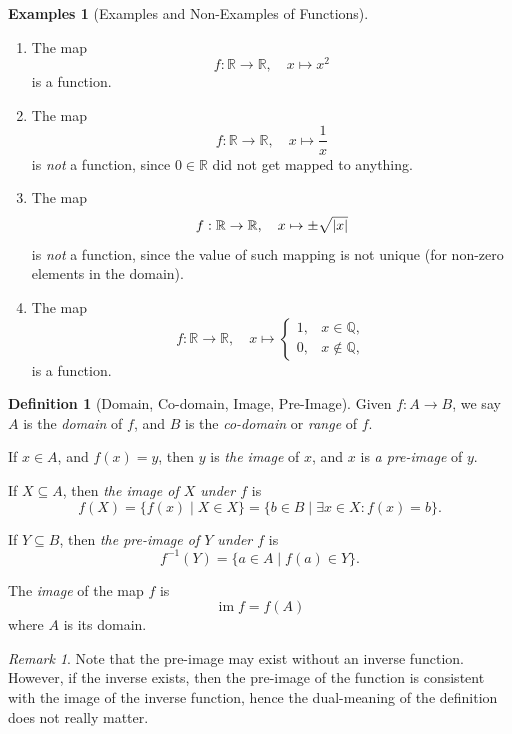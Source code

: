 \documentclass{article}
\theoremstyle{definition}
\newtheorem{definition}[theorem]{Definition}
\newtheorem{examples}[theorem]{Examples}
\theoremstyle{remark}
\newtheorem{remark}[theorem]{Remark}
\DeclarePairedDelimiter{\abs}{\lvert}{\rvert}
\newcommand{\pqty}[1]{\left(#1\right)}
\newcommand{\set}[2]{\{#1\mid #2\}}
\newcommand{\functiondomain}[3]{#1:#2\to #3}
\newcommand{\function}[5]{#1:#2\to #3,\quad #4\mapsto #5}
\newcommand{\inverse}{^{-1}}
\newcommand{\img}{\operatorname{im}}
\newcommand{\QQ}{\mathbb{Q}}
\newcommand{\RR}{\mathbb{R}}
\begin{document}
\begin{examples}[Examples and Non-Examples of Functions]
    \begin{enumerate}
        \item The map
        \[
            \function{f}{\RR}{\RR}{x}{x^2}
        \]
        is a function.

        \item The map
        \[
            \function{f}{\RR}{\RR}{x}{\frac{1}{x}}
        \]
        is \emph{not} a function, since \(0 \in \RR\) did not get mapped to anything.

        \item The map
        \[
            \function{f}{\RR}{\RR}{x}{\pm \sqrt{\abs{x}}}
        \]
        is \emph{not} a function, since the value of such mapping is not unique (for non-zero elements in the domain).

        \item The map
        \[
            \function{f}{\RR}{\RR}{x}{\begin{cases}
                1, & x \in \QQ, \\
                0, & x \notin \QQ,
            \end{cases}}
        \]
        is a function.
    \end{enumerate}
\end{examples}

\begin{definition}[Domain, Co-domain, Image, Pre-Image]
    Given \(\functiondomain{f}{A}{B}\), we say \(A\) is the \emph{domain} of \(f\), and \(B\) is the \emph{co-domain} or \emph{range} of \(f\).

    If \(x \in A\), and \(f\pqty{x} = y\), then \(y\) is \emph{the image} of \(x\), and \(x\) is \emph{a pre-image} of \(y\).

    If \(X \subseteq A\), then \emph{the image of \(X\) under \(f\)} is
    \[
        f\pqty{X} = \set{f\pqty{x}}{X \in X} = \set{b \in B}{\exists x \in X: f\pqty{x} = b}.
    \]

    If \(Y \subseteq B\), then \emph{the pre-image of \(Y\) under \(f\)} is
    \[
        f\inverse\pqty{Y} = \set{a \in A}{f\pqty{a} \in Y}.
    \]

    The \emph{image} of the map \(f\) is
    \[
        \img f = f \pqty{A}
    \]
    where \(A\) is its domain.
\end{definition}

\begin{remark}
    Note that the pre-image may exist without an inverse function. However, if the inverse exists, then the pre-image of the function is consistent with the image of the inverse function, hence the dual-meaning of the definition does not really matter.
\end{remark}
\end{document}
